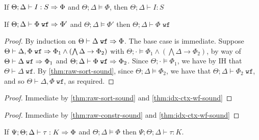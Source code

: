 \begin{theorem}
If $\Theta;\Delta \vdash I : S \Rightarrow \Phi$ and $\Theta;\Delta \vDash \Phi$, then $\Theta;\Delta \vdash I : S$ 
\label{thm:raw-sort-sound}
\end{theorem}

\begin{theorem}
If $\Theta ; \Delta \vdash \Phi \; \texttt{wf} \Rightarrow \Phi'$ and $\Theta ; \Delta \vDash \Phi'$ then
$\Theta ; \Delta \vdash \Phi \texttt{ wf}$
\label{thm:raw-constr-sound}
\end{theorem}

\idxctxwfsound*
\begin{proof}
By induction on $\Theta \vdash \Delta \; \texttt{wf} \Rightarrow \Phi$. The base case is immediate. Suppose $\Theta \vdash \Delta, \Phi \; \texttt{wf} \Rightarrow \Phi_1 \wedge (\bigwedge \Delta \to \Phi_2)$ with $\Theta ; \cdot \vDash \Phi_1 \wedge (\bigwedge \Delta \to \Phi_2)$, by way of
$\Theta \vdash \Delta \; \texttt{wf} \Rightarrow \Phi_1$ and $\Theta ; \Delta \vdash \Phi \; \texttt{wf} \Rightarrow \Phi_2$.
Since $\Theta ; \cdot \vDash \Phi_1$, we have by IH that $\Theta \vdash \Delta \; \texttt{wf}$. By \autoref{thm:raw-sort-sound}, since $\Theta ; \Delta \vDash \Phi_2$, we have that $\Theta ; \Delta \vdash \Phi_2 \; \texttt{wf}$, and so $\Theta \vdash \Delta, \Phi \; \texttt{wf}$, as required.
\end{proof}

\sortsound*
\begin{proof}
Immediate by \autoref{thm:raw-sort-sound} and \autoref{thm:idx-ctx-wf-sound}
\end{proof}


\constrsound*
\begin{proof}
Immediate by \autoref{thm:raw-constr-sound} and \autoref{thm:idx-ctx-wf-sound}
\end{proof}

\begin{theorem}
If $\Psi ; \Theta ; \Delta \vdash \tau : K \Rightarrow \Phi$ and $\Theta ; \Delta \vDash \Phi$ then $\Psi ; \Theta ; \Delta \vdash \tau : K$.
\label{thm:raw-kind-sound}
\end{theorem}

